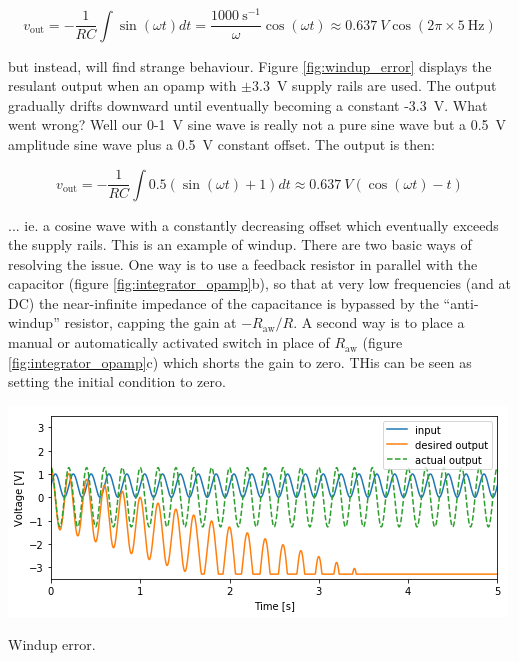\documentclass{tufte-book}
\begin{document}
$$
v_\text{out} = -\frac{1}{RC}\int\sin(\omega t)dt = \frac{1000~\text{s}^{-1}}{\omega}\cos(\omega t) \approx 0.637~V\cos(2\pi\times5~\text{Hz})
$$

\noindent but instead, will find strange behaviour. Figure \ref{fig:windup_error} displays the resulant output when an opamp with $\pm3.3$~V supply rails are used. The output gradually drifts downward until eventually becoming a constant -3.3~V. What went wrong? Well our 0-1~V sine wave is really not a pure sine wave but a 0.5~V amplitude sine wave plus a 0.5~V constant offset. The output is then:

$$
v_\text{out} = -\frac{1}{RC}\int0.5\left(\sin(\omega t) + 1\right)dt \approx 0.637~V\left(\cos(\omega t) - t\right)
$$

\noindent ... ie. a cosine wave with a constantly decreasing offset which eventually exceeds the supply rails. This is an example of windup. There are two basic ways of resolving the issue. One way is to use a feedback resistor in parallel with the capacitor (figure \ref{fig:integrator_opamp}b), so that at very low frequencies (and at DC) the near-infinite impedance of the capacitance is bypassed by the ``anti-windup'' resistor, capping the gain at $-R_\text{aw}/R$. A second way is to place a manual or automatically activated switch in place of $R_\text{aw}$ (figure \ref{fig:integrator_opamp}c) which shorts the gain to zero. THis can be seen as setting the initial condition to zero.

\begin{marginfigure}%
  \includegraphics[width=\linewidth]{windup_error}
  \caption{Windup error.}
  \label{fig:windup_error}
\end{marginfigure}


\backmatter

% 
% 


\printindex
\end{document}
